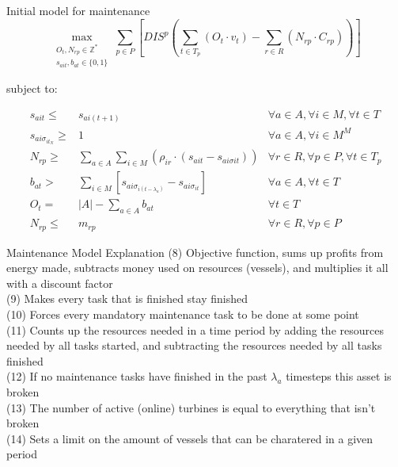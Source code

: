 \documentclass{beamer}
\begin{document}

\begin{frame}{Initial model for maintenance}
\footnotesize
\begin{equation}
	\max_{\substack{O_t, N_{rp} \in \mathbb{Z}^* \\ 
	s_{ait}, b_{at} \in \{0, 1\}}} 
	\sum_{p \in P} [ DIS^p (\sum_{t\in T_p} (O_t \cdot v_t)  - \sum_{r\in R} (N_{rp} \cdot C_{rp})) ]
\end{equation}

\bigskip

subject to:

\begin{align}
s_{ait} \leq& s_{ai(t+1)}													&	\forall a \in A, \forall i \in M, \forall t \in T	\\
s_{ai\sigma_{it_N}} \geq& 1												&	\forall a \in A, \forall i \in M^M			\\		
N_{rp} \geq& \sum_{a\in A} \sum_{i\in M} (\rho_{ir} \cdot (s_{ait} - s_{ai\sigma{it}})) 			& 	\forall r \in R, \forall p \in P, \forall t \in T_p 	\\
b_{at} >&  \sum_{i \in M} [s_{ai\sigma_{i(t - \lambda_a)}} - s_{ai\sigma_{it}}]					&	\forall a \in A, \forall t \in T 			\\
O_t =&  |A| - \sum_{a \in A} b_{at}											&	\forall t \in T 						\\
N_{rp} \leq& m_{rp}													&	 \forall r \in R, \forall p \in P
\end{align}

\end{frame}

\begin{frame}{Maintenance  Model Explanation}
(8) Objective function, sums up profits from energy made, subtracts money used on resources (vessels), and multiplies it all with a discount factor	\\
(9) Makes every task that is finished stay finished 	\\
(10) Forces every mandatory maintenance task to be done at some point	\\
(11) Counts up the resources needed in a time period by adding the resources needed by all tasks started, and subtracting the resources needed by all tasks finished	\\
(12) If no maintenance tasks have finished in the past $\lambda_a$ timesteps this asset is broken	\\
(13) The number of active (online) turbines is equal to everything that isn't broken \\
(14) Sets a limit on the amount of vessels that can be charatered in a given period
\end{frame}
\end{document}
